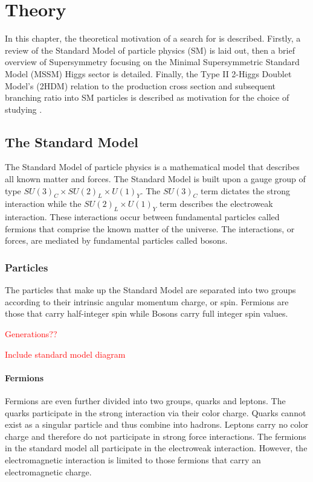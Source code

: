 \chapter{Theory}
    In this chapter, the theoretical motivation of a search for \HpLong is described. Firstly, a review of the Standard Model of particle physics (SM) is laid out, then a brief overview of Supersymmetry focusing on the Minimal Supersymmetric Standard Model (MSSM) Higgs sector is detailed. Finally, the Type II 2-Higgs Doublet Model's (2HDM) relation to the \Hp production cross section and subsequent branching ratio into SM particles is described as motivation for the choice of studying \HpLong.

\section{The Standard Model}
	The Standard Model of particle physics is a mathematical model that describes all known matter and forces. The Standard Model is built upon a gauge group of type $SU(3)_C \times SU(2)_L \times U(1)_Y$. The $SU(3)_C$ term dictates the strong interaction while the $SU(2)_L \times U(1)_Y$ term describes the electroweak interaction. These interactions occur between fundamental particles called fermions that comprise the known matter of the universe. The interactions, or forces, are mediated by fundamental particles called bosons. 

	\subsection{Particles}        
		The particles that make up the Standard Model are separated into two groups according to their intrinsic angular momentum charge, or spin. Fermions are those that carry half-integer spin while Bosons carry full integer spin values.

		\textcolor{red}{Generations??}

		\textcolor{red}{Include standard model diagram}

		\subsubsection{Fermions}	
		Fermions are even further divided into two groups, quarks and leptons. The quarks participate in the strong interaction via their color charge. Quarks cannot exist as a singular particle and thus combine into hadrons. Leptons carry no color charge and therefore do not participate in strong force interactions. The fermions in the standard model all participate in the electroweak interaction. However, the electromagnetic interaction is limited to those fermions that carry an electromagnetic charge.

